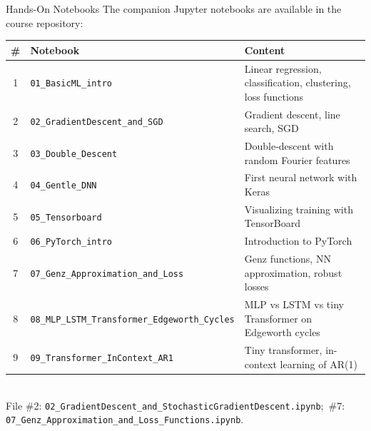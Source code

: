 \documentclass[aspectratio=169,11pt]{beamer}
\begin{document}
\begin{frame}[shrink=15]{Hands-On Notebooks}
The companion Jupyter notebooks are available in the course repository:

\vspace{0.3cm}
\begin{center}
{\scriptsize
\renewcommand{\arraystretch}{1.15}
\begin{tabular}{clp{5.2cm}}
\toprule
\textbf{\#} & \textbf{Notebook} & \textbf{Content} \\
\midrule
1 & \texttt{01\_BasicML\_intro} & Linear regression, classification, clustering, loss functions \\
2 & \texttt{02\_GradientDescent\_and\_SGD} & Gradient descent, line search, SGD \\
3 & \texttt{03\_Double\_Descent} & Double-descent with random Fourier features \\
4 & \texttt{04\_Gentle\_DNN} & First neural network with Keras \\
5 & \texttt{05\_Tensorboard} & Visualizing training with TensorBoard \\
6 & \texttt{06\_PyTorch\_intro} & Introduction to PyTorch \\
7 & \texttt{07\_Genz\_Approximation\_and\_Loss} & Genz functions, NN approximation, robust losses \\
8 & \texttt{08\_MLP\_LSTM\_Transformer\_Edgeworth\_Cycles} & MLP vs LSTM vs tiny Transformer on Edgeworth cycles \\
9 & \texttt{09\_Transformer\_InContext\_AR1} & Tiny transformer, in-context learning of AR(1) \\
\bottomrule
\end{tabular}
\vspace{0.2cm}\\
{\tiny File \#2: \texttt{02\_GradientDescent\_and\_StochasticGradientDescent.ipynb};\ \#7: \texttt{07\_Genz\_Approximation\_and\_Loss\_Functions.ipynb}.}
}%
\end{center}
\end{frame}
\end{document}
